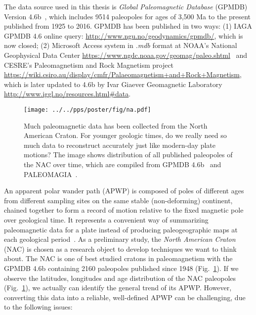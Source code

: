 The data source used in this thesis is \emph{Global Paleomagnetic
Database} (GPMDB) Version 4.6b~\cite[updated in 2016 by the Ivar Giaever
Geomagnetic Laboratory team, in collaboration with Pisarevsky]{M96,P05}, which
includes 9514 paleopoles for ages of 3,500 Ma to the present published from 1925
to 2016. GPMDB has been published in two ways: (1) IAGA GPMDB 4.6 online query:
\url{http://www.ngu.no/geodynamics/gpmdb/}, which is now closed; (2) Microsoft
Access system in \emph{.mdb} format at NOAA's National Geophysical Data Center
\url{https://www.ngdc.noaa.gov/geomag/paleo.shtml}~\citep{P03}
and CESRE's Paleomagnetism and Rock Magnetism project
\url{https://wiki.csiro.au/display/cmfr/Palaeomagnetism+and+Rock+Magnetism},
which is later updated to 4.6b by Ivar Giaever Geomagnetic Laboratory
\url{http://www.iggl.no/resources.html\#data}.

\begin{figure}[!ht]
  \centering
  \texttt{[image: ../../pps/poster/fig/na.pdf]}
  \captionsetup{width=1\textwidth}
  \caption[All published paleomagnetic data from North America]{Much
paleomagnetic data has been collected from the North American Craton. For
younger geologic times, do we really need so much data to reconstruct accurately
just like modern-day plate motions? The image shows distribution of all
published paleopoles of the NAC over time, which are compiled from GPMDB
4.6b~\citep{P05} and PALEOMAGIA~\citep{V14}.}\label{Fig:chap_intro_nacpole}
\end{figure}

An apparent polar wander path (APWP) is composed of poles of different ages
from different sampling sites on the same stable (non-deforming) continent,
chained together to form a record of motion relative to the fixed magnetic pole
over geological time. It represents a convenient way of summarizing
paleomagnetic data for a plate instead of producing paleogeographic maps at
each geological period~\citep{T08}. As a preliminary study, the \emph{North
American Craton} (NAC) is chosen as a research object to develop techniques we
want to think about. The NAC is one of best studied cratons in paleomagnetism
with the GPMDB 4.6b containing 2160 paleopoles published since 1948
(Fig.~\ref{Fig:chap_intro_nacpole}). If we observe the latitudes, longitudes and
age distribution of the NAC paleopoles (Fig.~\ref{Fig:chap_intro_nacpole}), we
actually can identify the general trend of its APWP\@. However, converting this
data into a reliable, well-defined APWP can be challenging, due to the following
issues:

